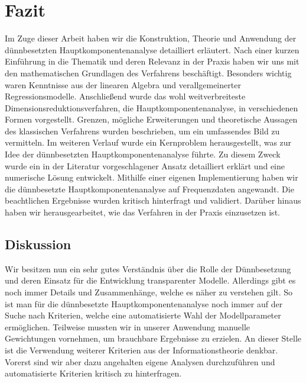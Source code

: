 \chapter{Fazit}

\label{conclusion}

Im Zuge dieser Arbeit haben wir die Konstruktion, Theorie und Anwendung der dünnbesetzten Hauptkomponentenanalyse detailliert erläutert.
Nach einer kurzen Einführung in die Thematik und deren Relevanz in der Praxis haben wir uns mit den mathematischen Grundlagen des Verfahrens beschäftigt. Besonders wichtig waren Kenntnisse aus der linearen Algebra und verallgemeinerter Regressionsmodelle. Anschließend wurde das wohl weitverbreiteste Dimensionsreduktionsverfahren, die Hauptkomponentenanalyse, in verschiedenen Formen vorgestellt. Grenzen, mögliche Erweiterungen und theoretische Aussagen des klassischen Verfahrens wurden beschrieben, um ein umfassendes Bild zu vermitteln. Im weiteren Verlauf wurde ein Kernproblem herausgestellt, was zur Idee der dünnbesetzten Hauptkomponentenanalyse führte. Zu diesem Zweck wurde ein in der Literatur vorgeschlagener Ansatz detailliert erklärt und eine numerische Lösung entwickelt. Mithilfe einer eigenen Implementierung haben wir die dünnbesetzte Hauptkomponentenanalyse auf Frequenzdaten angewandt. Die beachtlichen Ergebnisse wurden kritisch hinterfragt und validiert. Darüber hinaus haben wir herausgearbeitet, wie das Verfahren in der Praxis einzusetzen ist.




\section{Diskussion}

Wir besitzen nun ein sehr gutes Verständnis über die Rolle der Dünnbesetzung und deren Einsatz für die Entwicklung transparenter Modelle. Allerdings gibt es noch immer Details und Zusammenhänge, welche es näher zu verstehen gilt. So ist man für die dünnbesetzte Hauptkomponentenanalyse noch immer auf der Suche nach Kriterien, welche eine automatisierte Wahl der Modellparameter ermöglichen. Teilweise mussten wir in unserer Anwendung manuelle Gewichtungen vornehmen, um brauchbare Ergebnisse zu erzielen. An dieser Stelle ist die Verwendung weiterer Kriterien aus der Informationstheorie denkbar. Vorerst sind wir aber dazu angehalten eigene Analysen durchzuführen und automatisierte Kriterien kritisch zu hinterfragen.

